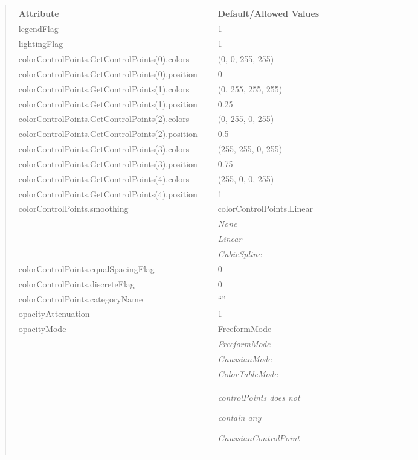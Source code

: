 \documentclass[letterpaper,10pt,english]{sphinxmanual}
\begin{document}
\begin{quote}
\begin{longtable}{|p{0.475\linewidth}|p{0.475\linewidth}|}
\textbf{Attribute}
 & 
\textbf{Default/Allowed Values}
\\
\hline
legendFlag
 & 
1
\\
\hline
lightingFlag
 & 
1
\\
\hline
colorControlPoints.GetControlPoints(0).colors
 & 
(0, 0, 255, 255)
\\
\hline
colorControlPoints.GetControlPoints(0).position
 & 
0
\\
\hline
colorControlPoints.GetControlPoints(1).colors
 & 
(0, 255, 255, 255)
\\
\hline
colorControlPoints.GetControlPoints(1).position
 & 
0.25
\\
\hline
colorControlPoints.GetControlPoints(2).colors
 & 
(0, 255, 0, 255)
\\
\hline
colorControlPoints.GetControlPoints(2).position
 & 
0.5
\\
\hline
colorControlPoints.GetControlPoints(3).colors
 & 
(255, 255, 0, 255)
\\
\hline
colorControlPoints.GetControlPoints(3).position
 & 
0.75
\\
\hline
colorControlPoints.GetControlPoints(4).colors
 & 
(255, 0, 0, 255)
\\
\hline
colorControlPoints.GetControlPoints(4).position
 & 
1
\\
\hline
colorControlPoints.smoothing
 & 
colorControlPoints.Linear
\\
\hline & 
\emph{None}
\\
\hline & 
\emph{Linear}
\\
\hline & 
\emph{CubicSpline}
\\
\hline
colorControlPoints.equalSpacingFlag
 & 
0
\\
\hline
colorControlPoints.discreteFlag
 & 
0
\\
\hline
colorControlPoints.categoryName
 & 
``''
\\
\hline
opacityAttenuation
 & 
1
\\
\hline
opacityMode
 & 
FreeformMode
\\
\hline & 
\emph{FreeformMode}
\\
\hline & 
\emph{GaussianMode}
\\
\hline & 
\emph{ColorTableMode}
\\
\hline & 
\begin{DUlineblock}{0em}
\item[] \emph{controlPoints does not}
\item[] \emph{contain any}
\item[] \emph{GaussianControlPoint}

\end{DUlineblock}
\end{longtable}
\end{quote}
\end{document}
